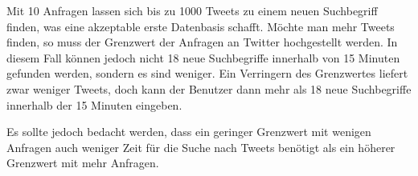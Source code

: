 Mit 10 Anfragen lassen sich bis zu 1000 Tweets zu einem neuen Suchbegriff finden, was eine akzeptable erste Datenbasis schafft.
Möchte man mehr Tweets finden, so muss der Grenzwert der Anfragen an Twitter hochgestellt werden.
In diesem Fall können jedoch nicht 18 neue Suchbegriffe innerhalb von 15 Minuten gefunden werden, sondern es sind weniger.
Ein Verringern des Grenzwertes liefert zwar weniger Tweets, doch kann der Benutzer dann mehr als 18 neue Suchbegriffe innerhalb der 15 Minuten eingeben.

Es sollte jedoch bedacht werden, dass ein geringer Grenzwert mit wenigen Anfragen auch weniger Zeit für die Suche nach Tweets benötigt als ein höherer Grenzwert mit mehr Anfragen.

\begin{figure}[h!]
\centering


\end{figure}
